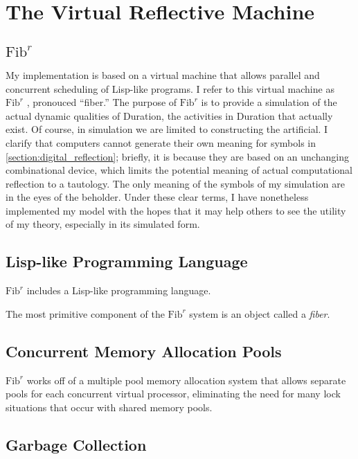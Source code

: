 \chapter{The Virtual Reflective Machine}
\label{chapter:the_virtual_reflective_machine}

\newcommand{\FibR}{$\text{Fib}^r$ }
\section{\FibR}

My implementation is based on a virtual machine that allows parallel
and concurrent scheduling of Lisp-like programs.  I refer to this
virtual machine as \FibR, pronouced ``fiber.''  The purpose of \FibR
is to provide a simulation of the actual dynamic qualities of
Duration, the activities in Duration that actually exist.  Of course,
in simulation we are limited to constructing the artificial.  I
clarify that computers cannot generate their own meaning for symbols
in \autoref{section:digital_reflection}; briefly, it is because they
are based on an unchanging combinational device, which limits the
potential meaning of actual computational reflection to a tautology.
The only meaning of the symbols of my simulation are in the eyes of
the beholder.  Under these clear terms, I have nonetheless implemented
my model with the hopes that it may help others to see the utility of
my theory, especially in its simulated form.

\section{Lisp-like Programming Language}

\FibR includes a Lisp-like programming language.

The most primitive component of the \FibR system is an object called a
\emph{fiber}.

\section{Concurrent Memory Allocation Pools}

\FibR works off of a multiple pool memory allocation system that
allows separate pools for each concurrent virtual processor,
eliminating the need for many lock situations that occur with shared
memory pools.

\section{Garbage Collection}



